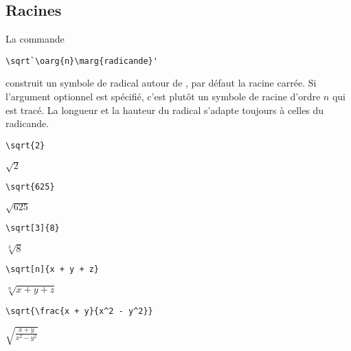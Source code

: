 
\subsection{Racines}
\label{sec:math:bases:racines}

La commande
\begin{lstlisting}
\sqrt`\oarg{n}\marg{radicande}'
\end{lstlisting}
construit un symbole de radical autour de , par défaut
la racine carrée. Si l'argument optionnel  est spécifié, c'est
plutôt un symbole de racine d'ordre $n$ qui est tracé. La longueur et
la hauteur du radical s'adapte toujours à celles du radicande.
\begin{demo}
  \begin{minipage}{0.3\linewidth}
    \begin{texample}[0.65\linewidth]
\begin{lstlisting}
\sqrt{2}
\end{lstlisting}
      \producing $\sqrt{2}$
    \end{texample}
  \end{minipage}
  \quad
  \begin{minipage}{0.3\linewidth}
    \begin{texample}[0.67\linewidth]
\begin{lstlisting}
\sqrt{625}
\end{lstlisting}
      \producing
      $\sqrt{625}$
    \end{texample}
  \end{minipage}
  \quad
  \begin{minipage}{0.3\linewidth}
    \begin{texample}[0.67\linewidth]
\begin{lstlisting}
\sqrt[3]{8}
\end{lstlisting}
      \producing
      $\sqrt[3]{8}$
    \end{texample}
  \end{minipage}

  \begin{texample}[0.55\linewidth]
\begin{lstlisting}
\sqrt[n]{x + y + z}
\end{lstlisting}
    \producing
    $\sqrt[n]{x + y + z}$
  \end{texample}

  \begin{texample}[0.55\linewidth]
\begin{lstlisting}
\sqrt{\frac{x + y}{x^2 - y^2}}
\end{lstlisting}
    \producing
    $\displaystyle \sqrt{\frac{x + y}{x^2 - y^2}}$
  \end{texample}
\end{demo}

